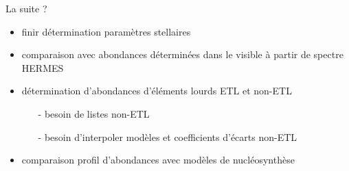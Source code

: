 \documentclass[10pt]{beamer}
\begin{document}
\begin{frame}[fragile]{La suite ?}
    \begin{itemize}
        \item finir détermination paramètres stellaires
        \item comparaison avec abondances déterminées dans le visible à partir de spectre HERMES
        \item détermination  d'abondances d'éléments lourds ETL et non-ETL
        \begin{itemize}
            \item [-] besoin de listes non-ETL
            \item [-] besoin d'interpoler modèles et coefficients d'écarts non-ETL
        \end{itemize}
        \item comparaison profil d'abondances avec modèles de nucléosynthèse
    \end{itemize} 
\end{frame}







\end{document}
